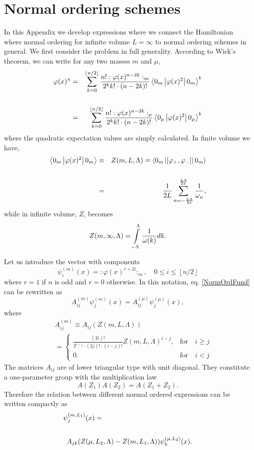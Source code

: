 \documentclass[twocolumn,secnumarabic,amssymb, nobibnotes, aps, prd]{revtex4-2}
\newcommand{\be}{\begin{equation}}
\newcommand{\ee}{\end{equation}}
\newcommand{\bea}{\begin{eqnarray}}
\newcommand{\eea}{\end{eqnarray}}
\begin{document}
\section{Normal ordering schemes}  \label{SubsecNormOrdSchemes}

In this Appendix we develop expressions where we connect the Hamiltonian where normal ordering for infinite volume $L=\infty$ to normal ordering schemes in general.  We first consider the problem in full generality.
According to Wick's theorem, we can write for any two masses $m$ and $\mu$,
\bea
\varphi(x)^n &=& \sum_{k=0}^{\left\lfloor n/2 \right\rfloor} \frac{n! :\varphi(x)^{n-2k}:_m}{2^k k!\cdot(n-2k)!}\left\langle 0_m \left| \varphi(x)^2 \right| 0_m \right\rangle^k\cr\cr
&=&\sum_{k=0}^{\left\lfloor n/2 \right\rfloor} \frac{n!:\varphi(x)^{n-2k}:_\mu}{2^k k!\cdot(n-2k)!}\left\langle 0_\mu \left| \varphi(x)^2 \right| 0_\mu \right\rangle^k \label{NormOrdFund}
\eea
where the quadratic expectation values are simply calculated. In finite volume we have,
\bea
\left\langle 0_m \left| \varphi(x)^2 \right| 0_m \right\rangle &\equiv& Z(m,L,\Lambda)=\left\langle 0_m \left| \left[\varphi_+,\varphi_-\right] \right| 0_m \right\rangle\cr\cr 
&=&\frac{1}{2L}\sum_{n=-\frac{L\Lambda}{2\pi}}^{\frac{L\Lambda}{2\pi}}\frac{1}{\omega_n},
\eea
while in infinite volume, $Z$, becomes
\be
Z(m,\infty,\Lambda)=\intop_{-\Lambda}^{\Lambda}\frac{1}{\omega(k)}dk.
\ee

Let us introduce the vector with components
\be
\psi_i^{(m)}(x)=:\varphi(x)^{r+2i}:_m,\quad0\leq i\leq\left\lfloor n/2 \right\rfloor
\ee
where $r=1$ if $n$ is odd and $r=0$ otherwise. In this notation, eq. \eqref{NormOrdFund}
can be rewritten as
\be
A_{ij}^{(m)}\psi_j^{(m)}(x)=A_{ij}^{(\mu)}\psi_j^{(\mu)}(x),
\ee
where
\bea
&&A_{ij}^{(m)}\equiv A_{ij}(Z(m,L,\Lambda))\nonumber\\
&&=
\begin{cases}
\frac{(2i)!}{2^{i-j}\cdot(2j)!\cdot(i-j)!}Z(m,L,\Lambda)^{i-j},& \text{for}\quad i\geq j\\
0. & \text{for}\quad i < j
\end{cases}
\eea
The matrices $A_{ij}$ are of lower triangular type with unit diagonal. They constitute a one-parameter group with the multiplication law
\be
A(Z_1)A(Z_2)=A(Z_1+Z_2).
\ee
Therefore the relation between different normal ordered expressions can be written compactly as
\bea
\psi_j^{(m,L_1)}(x) &=& \cr\cr 
&& \hskip -.85in A_{jk}(Z(\mu,L_2,\Lambda)-Z(m,L_1,\Lambda))\psi_k^{(\mu,L_2)}(x) .\label{NOrdMaster}
\eea
\end{document}

